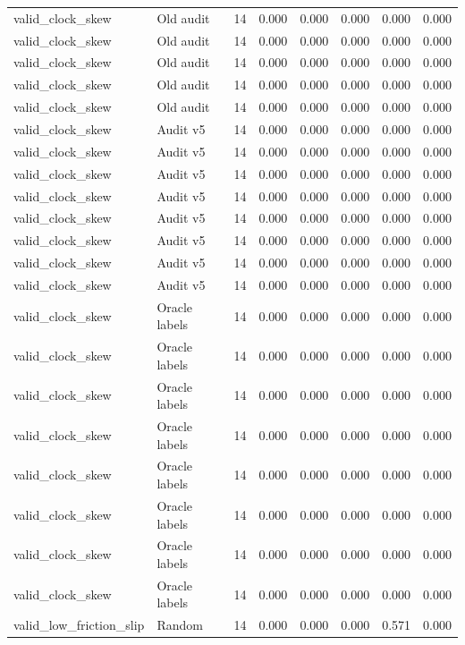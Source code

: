 {\begin{longtable}{llrrrrrr}
valid\_clock\_skew & Old audit & 14 & 0.000 & 0.000 & 0.000 & 0.000 & 0.000 \\
valid\_clock\_skew & Old audit & 14 & 0.000 & 0.000 & 0.000 & 0.000 & 0.000 \\
valid\_clock\_skew & Old audit & 14 & 0.000 & 0.000 & 0.000 & 0.000 & 0.000 \\
valid\_clock\_skew & Old audit & 14 & 0.000 & 0.000 & 0.000 & 0.000 & 0.000 \\
valid\_clock\_skew & Old audit & 14 & 0.000 & 0.000 & 0.000 & 0.000 & 0.000 \\
valid\_clock\_skew & Audit v5 & 14 & 0.000 & 0.000 & 0.000 & 0.000 & 0.000 \\
valid\_clock\_skew & Audit v5 & 14 & 0.000 & 0.000 & 0.000 & 0.000 & 0.000 \\
valid\_clock\_skew & Audit v5 & 14 & 0.000 & 0.000 & 0.000 & 0.000 & 0.000 \\
valid\_clock\_skew & Audit v5 & 14 & 0.000 & 0.000 & 0.000 & 0.000 & 0.000 \\
valid\_clock\_skew & Audit v5 & 14 & 0.000 & 0.000 & 0.000 & 0.000 & 0.000 \\
valid\_clock\_skew & Audit v5 & 14 & 0.000 & 0.000 & 0.000 & 0.000 & 0.000 \\
valid\_clock\_skew & Audit v5 & 14 & 0.000 & 0.000 & 0.000 & 0.000 & 0.000 \\
valid\_clock\_skew & Audit v5 & 14 & 0.000 & 0.000 & 0.000 & 0.000 & 0.000 \\
valid\_clock\_skew & Oracle labels & 14 & 0.000 & 0.000 & 0.000 & 0.000 & 0.000 \\
valid\_clock\_skew & Oracle labels & 14 & 0.000 & 0.000 & 0.000 & 0.000 & 0.000 \\
valid\_clock\_skew & Oracle labels & 14 & 0.000 & 0.000 & 0.000 & 0.000 & 0.000 \\
valid\_clock\_skew & Oracle labels & 14 & 0.000 & 0.000 & 0.000 & 0.000 & 0.000 \\
valid\_clock\_skew & Oracle labels & 14 & 0.000 & 0.000 & 0.000 & 0.000 & 0.000 \\
valid\_clock\_skew & Oracle labels & 14 & 0.000 & 0.000 & 0.000 & 0.000 & 0.000 \\
valid\_clock\_skew & Oracle labels & 14 & 0.000 & 0.000 & 0.000 & 0.000 & 0.000 \\
valid\_clock\_skew & Oracle labels & 14 & 0.000 & 0.000 & 0.000 & 0.000 & 0.000 \\
valid\_low\_friction\_slip & Random & 14 & 0.000 & 0.000 & 0.000 & 0.571 & 0.000 \\

\end{longtable}}
